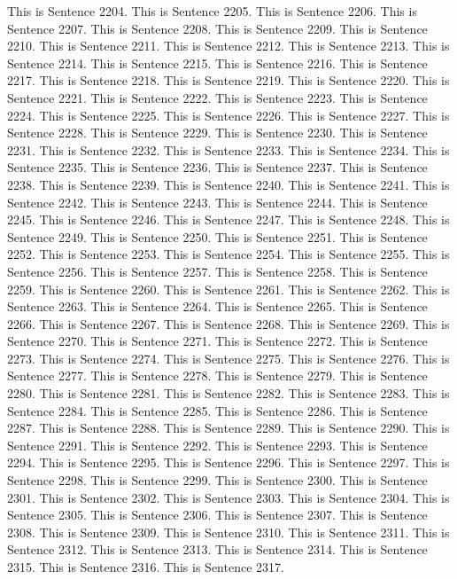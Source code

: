 \documentclass{article}
\begin{document}
This is Sentence 2204.
This is Sentence 2205.
This is Sentence 2206.
This is Sentence 2207.
This is Sentence 2208.
This is Sentence 2209.
This is Sentence 2210.
This is Sentence 2211.
This is Sentence 2212.
This is Sentence 2213.
This is Sentence 2214.
This is Sentence 2215.
This is Sentence 2216.
This is Sentence 2217.
This is Sentence 2218.
This is Sentence 2219.
This is Sentence 2220.
This is Sentence 2221.
This is Sentence 2222.
This is Sentence 2223.
This is Sentence 2224.
This is Sentence 2225.
This is Sentence 2226.
This is Sentence 2227.
This is Sentence 2228.
This is Sentence 2229.
This is Sentence 2230.
This is Sentence 2231.
This is Sentence 2232.
This is Sentence 2233.
This is Sentence 2234.
This is Sentence 2235.
This is Sentence 2236.
This is Sentence 2237.
This is Sentence 2238.
This is Sentence 2239.
This is Sentence 2240.
This is Sentence 2241.
This is Sentence 2242.
This is Sentence 2243.
This is Sentence 2244.
This is Sentence 2245.
This is Sentence 2246.
This is Sentence 2247.
This is Sentence 2248.
This is Sentence 2249.
This is Sentence 2250.
This is Sentence 2251.
This is Sentence 2252.
This is Sentence 2253.
This is Sentence 2254.
This is Sentence 2255.
This is Sentence 2256.
This is Sentence 2257.
This is Sentence 2258.
This is Sentence 2259.
This is Sentence 2260.
This is Sentence 2261.
This is Sentence 2262.
This is Sentence 2263.
This is Sentence 2264.
This is Sentence 2265.
This is Sentence 2266.
This is Sentence 2267.
This is Sentence 2268.
This is Sentence 2269.
This is Sentence 2270.
This is Sentence 2271.
This is Sentence 2272.
This is Sentence 2273.
This is Sentence 2274.
This is Sentence 2275.
This is Sentence 2276.
This is Sentence 2277.
This is Sentence 2278.
This is Sentence 2279.
This is Sentence 2280.
This is Sentence 2281.
This is Sentence 2282.
This is Sentence 2283.
This is Sentence 2284.
This is Sentence 2285.
This is Sentence 2286.
This is Sentence 2287.
This is Sentence 2288.
This is Sentence 2289.
This is Sentence 2290.
This is Sentence 2291.
This is Sentence 2292.
This is Sentence 2293.
This is Sentence 2294.
This is Sentence 2295.
This is Sentence 2296.
This is Sentence 2297.
This is Sentence 2298.
This is Sentence 2299.
This is Sentence 2300.
This is Sentence 2301.
This is Sentence 2302.
This is Sentence 2303.
This is Sentence 2304.
This is Sentence 2305.
This is Sentence 2306.
This is Sentence 2307.
This is Sentence 2308.
This is Sentence 2309.
This is Sentence 2310.
This is Sentence 2311.
This is Sentence 2312.
This is Sentence 2313.
This is Sentence 2314.
This is Sentence 2315.
This is Sentence 2316.
This is Sentence 2317.
\end{document}
